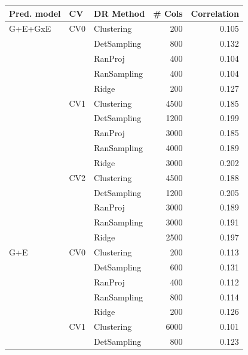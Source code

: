 \begin{center}
\begin{table}[]
\centering
\begin{tabular}{@{}lllrr@{}}
\toprule
Pred. model & CV  & DR Method     & \# Cols & Correlation \\ \midrule
G+E+GxE    & CV0 & Clustering  & 200     & 0.105       \\
           &     & DetSampling & 800    & 0.132       \\
           &     & RanProj     & 400    & 0.104        \\
           &     & RanSampling & 400     & 0.104        \\
           &     & Ridge       & 200     & 0.127       \\
           \cline{2-5}
           & CV1 & Clustering  & 4500    & 0.185       \\
           &     & DetSampling & 1200    & 0.199        \\      
           &     & RanProj     & 3000   & 0.185       \\
           &     & RanSampling & 4000   & 0.189       \\       
           &     & Ridge       & 3000    & 0.202       \\ \cline{2-5}
           & CV2 & Clustering  & 4500    & 0.188       \\
           &     & DetSampling & 1200    & 0.205       \\       
           &     & RanProj     & 3000   & 0.189       \\
           &     & RanSampling & 3000   & 0.191       \\
           &     & Ridge       & 2500    & 0.197       \\ \cline{1-5}
G+E        & CV0 & Clustering  & 200    & 0.113       \\
           &     & DetSampling & 600    & 0.131       \\
           &     & RanProj     & 400    & 0.112       \\
           &     & RanSampling & 800   & 0.114        \\
           &     & Ridge       & 200     & 0.126       \\ \cline{2-5}
           & CV1 & Clustering  & 6000    & 0.101       \\
           &     & DetSampling & 800    & 0.123       \\

\end{tabular}
\end{table}
\end{center}
